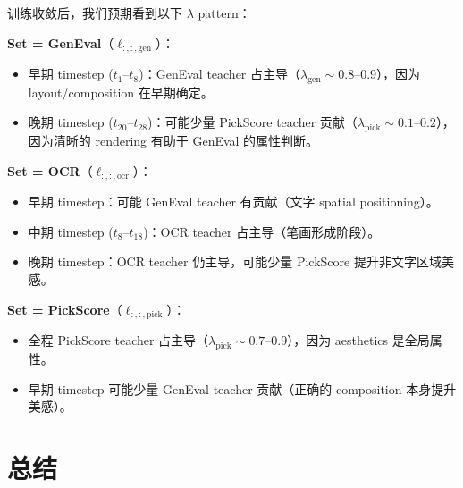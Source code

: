 \documentclass[11pt,a4paper]{article}
\theoremstyle{definition}
\begin{document}
\begin{tcolorbox}[colback=yellow!5, colframe=yellow!60!black, title=预期实验结果]
训练收敛后，我们预期看到以下 $\lambda$ pattern：

\textbf{Set = GenEval}（$\ell_{:,:,\mathrm{gen}}$）：
\begin{itemize}[leftmargin=1em]
\item 早期 timestep ($t_1$--$t_8$)：GenEval teacher 占主导（$\lambda_{\mathrm{gen}} \sim 0.8$--$0.9$），因为 layout/composition 在早期确定。
\item 晚期 timestep ($t_{20}$--$t_{28}$)：可能少量 PickScore teacher 贡献（$\lambda_{\mathrm{pick}} \sim 0.1$--$0.2$），因为清晰的 rendering 有助于 GenEval 的属性判断。
\end{itemize}

\textbf{Set = OCR}（$\ell_{:,:,\mathrm{ocr}}$）：
\begin{itemize}[leftmargin=1em]
\item 早期 timestep：可能 GenEval teacher 有贡献（文字 spatial positioning）。
\item 中期 timestep ($t_8$--$t_{18}$)：OCR teacher 占主导（笔画形成阶段）。
\item 晚期 timestep：OCR teacher 仍主导，可能少量 PickScore 提升非文字区域美感。
\end{itemize}

\textbf{Set = PickScore}（$\ell_{:,:,\mathrm{pick}}$）：
\begin{itemize}[leftmargin=1em]
\item 全程 PickScore teacher 占主导（$\lambda_{\mathrm{pick}} \sim 0.7$--$0.9$），因为 aesthetics 是全局属性。
\item 早期 timestep 可能少量 GenEval teacher 贡献（正确的 composition 本身提升美感）。
\end{itemize}
\end{tcolorbox}

\section{总结}
\label{sec:summary}
\end{document}

